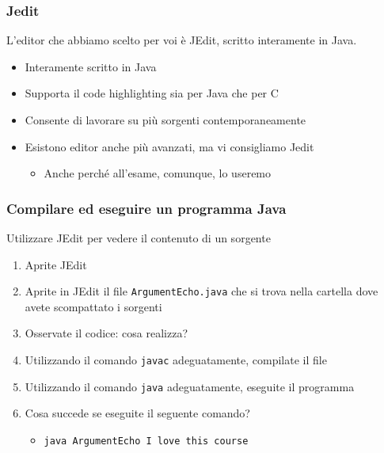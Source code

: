 \documentclass{beamer}
\begin{document}
\begin{frame}[fragile]
\frametitle{Jedit}
L'editor che abbiamo scelto per voi è JEdit, scritto interamente in Java.
 \begin{itemize}
 \item Interamente scritto in Java
 \item Supporta il code highlighting sia per Java che per C
 \item Consente di lavorare su più sorgenti contemporaneamente
 \item Esistono editor anche più avanzati, ma vi consigliamo Jedit
 \begin{itemize}
 \item Anche perché all'esame, comunque, lo useremo
 \end{itemize}
 \end{itemize}
\end{frame}

\begin{frame}[fragile]
\frametitle{Compilare ed eseguire un programma Java}
\begin{block}{Utilizzare JEdit per vedere il contenuto di un sorgente}
\begin{enumerate}
 \item Aprite JEdit
 \item Aprite in JEdit il file \texttt{ArgumentEcho.java} che si trova nella cartella dove avete scompattato i sorgenti
 \item Osservate il codice: cosa realizza?
 \item Utilizzando il comando \texttt{javac} adeguatamente, compilate il file
 \item Utilizzando il comando \texttt{java} adeguatamente, eseguite il programma
 \item Cosa succede se eseguite il seguente comando?
 \begin{itemize}
  \item \texttt{java ArgumentEcho I love this course}
 \end{itemize}
\end{enumerate}
\end{block}
\end{frame}
\end{document}
